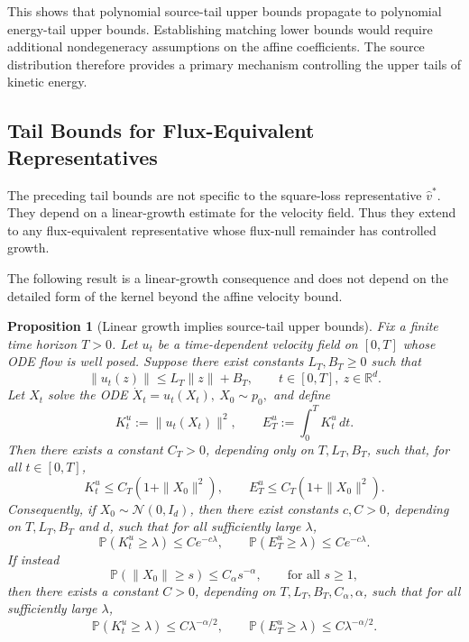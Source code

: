 \documentclass[a4paper,11pt]{article}
\newcommand{\R}{\mathbb{R}}
\theoremstyle{plain}
\newtheorem{propositioninner}[theoreminner]{Proposition}
\theoremstyle{definition}
\newenvironment{proposition}[1][]
  {\begin{mdframed}[style=propositionstyle]\begin{propositioninner}[#1]}
  {\end{propositioninner}\end{mdframed}}
\begin{document}
This shows that polynomial source-tail upper bounds propagate to polynomial energy-tail upper bounds. Establishing matching lower bounds would require additional nondegeneracy assumptions on the affine coefficients.
The source distribution therefore provides a primary mechanism controlling the upper tails of kinetic energy.

\subsection{Tail Bounds for Flux-Equivalent Representatives}
\label{subsec:flux_tail}

The preceding tail bounds are not specific to the square-loss representative \(\hat v^\ast\). They depend on a linear-growth estimate for the velocity field. Thus they extend to any flux-equivalent representative whose flux-null remainder has controlled growth.

The following result is a linear-growth consequence and does not depend on the detailed form of the kernel beyond the affine velocity bound.

\begin{proposition}[Linear growth implies source-tail upper bounds]
\label{lem:linear_growth_tail}
Fix a finite time horizon \(T>0\). Let \(u_t\) be a time-dependent velocity field on
\([0,T]\) whose ODE flow is well posed. Suppose there exist constants
\(L_T,B_T\ge0\) such that
\[
    \|u_t(z)\|\le L_T\|z\|+B_T,
    \qquad t\in[0,T],\ z\in\R^d.
\]
Let \(X_t\) solve the ODE
\(
    \dot X_t=u_t(X_t),
    \  X_0\sim p_0,
\)
and define
\[
    K_t^u:=\|u_t(X_t)\|^2,
    \qquad
    E_T^u:=\int_0^T K_t^u\,dt.
\]
Then there exists a constant \(C_T>0\), depending only on
\(T,L_T,B_T\), such that, for all \(t\in[0,T]\),
\[
    K_t^u\le C_T(1+\|X_0\|^2),
    \qquad
    E_T^u\le C_T(1+\|X_0\|^2).
\]
Consequently, if \(X_0\sim\mathcal N(0,I_d)\), then there exist constants
\(c,C>0\), depending on \(T,L_T,B_T\) and \(d\), such that for all
sufficiently large \(\lambda\),
\[
    \mathbb P(K_t^u\ge \lambda)\le C e^{-c\lambda},
    \qquad
    \mathbb P(E_T^u\ge \lambda)\le C e^{-c\lambda}.
\]
If instead
\[
    \mathbb P(\|X_0\|\ge s)\le C_\alpha s^{-\alpha},
    \qquad\text{for all }s\ge1,
\]
then there exists a constant \(C>0\), depending on
\(T,L_T,B_T,C_\alpha,\alpha\), such that for all sufficiently large
\(\lambda\),
\[
    \mathbb P(K_t^u\ge \lambda)\le C\lambda^{-\alpha/2},
    \qquad
    \mathbb P(E_T^u\ge \lambda)\le C\lambda^{-\alpha/2}.
\]
\end{proposition}
\end{document}
